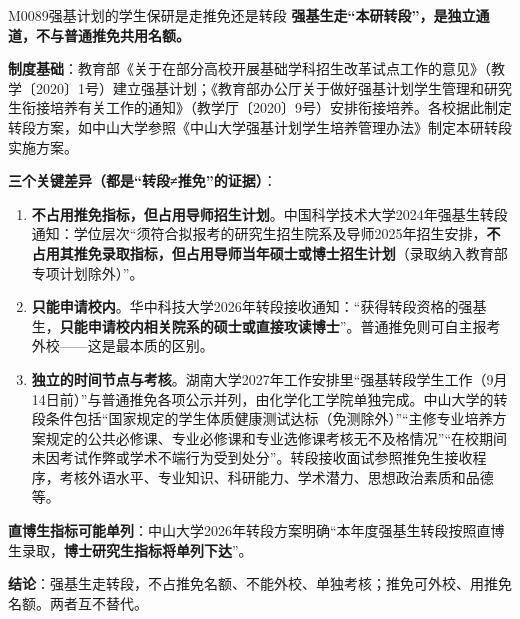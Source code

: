 \begin{qa}{M0089}{强基计划的学生保研是走推免还是转段}
\textbf{强基生走“本研转段”，是独立通道，不与普通推免共用名额。}

\textbf{制度基础}：教育部《关于在部分高校开展基础学科招生改革试点工作的意见》（教学〔2020〕1号）建立强基计划；《教育部办公厅关于做好强基计划学生管理和研究生衔接培养有关工作的通知》（教学厅〔2020〕9号）安排衔接培养。各校据此制定转段方案，如中山大学参照《中山大学强基计划学生培养管理办法》制定本研转段实施方案。

\textbf{三个关键差异（都是“转段≠推免”的证据）}：

\begin{enumerate}
  \item \textbf{不占用推免指标，但占用导师招生计划}。中国科学技术大学2024年强基生转段通知：学位层次“须符合拟报考的研究生招生院系及导师2025年招生安排，\textbf{不占用其推免录取指标，但占用导师当年硕士或博士招生计划}（录取纳入教育部专项计划除外）”。
  \item \textbf{只能申请校内}。华中科技大学2026年转段接收通知：“获得转段资格的强基生，\textbf{只能申请校内相关院系的硕士或直接攻读博士}”。普通推免则可自主报考外校——这是最本质的区别。
  \item \textbf{独立的时间节点与考核}。湖南大学2027年工作安排里“强基转段学生工作（9月14日前）”与普通推免各项公示并列，由化学化工学院单独完成。中山大学的转段条件包括“国家规定的学生体质健康测试达标（免测除外）”“主修专业培养方案规定的公共必修课、专业必修课和专业选修课考核无不及格情况”“在校期间未因考试作弊或学术不端行为受到处分”。转段接收面试参照推免生接收程序，考核外语水平、专业知识、科研能力、学术潜力、思想政治素质和品德等。
\end{enumerate}

\textbf{直博生指标可能单列}：中山大学2026年转段方案明确“本年度强基生转段按照直博生录取，\textbf{博士研究生指标将单列下达}”。

\textbf{结论}：强基生走转段，不占推免名额、不能外校、单独考核；推免可外校、用推免名额。两者互不替代。
\end{qa}

